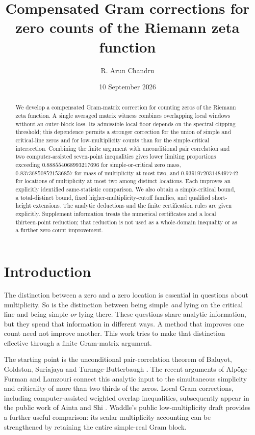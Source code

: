 \documentclass[11pt]{amsart}
\title[Compensated Gram corrections and zero counts]{Compensated Gram corrections for zero counts of the Riemann zeta function}
\author{R. Arun Chandru}
\date{10 September 2026}
\numberwithin{equation}{section}
\begin{document}
\begin{abstract}
We develop a compensated Gram-matrix correction for counting zeros of the
Riemann zeta function. A single averaged matrix witness combines overlapping
local windows without an outer-block loss. Its admissible local floor depends
on the spectral clipping threshold; this dependence permits a stronger
correction for the union of simple and critical-line zeros and for
low-multiplicity counts than for the simple-critical intersection.
Combining the finite argument with unconditional pair correlation and two
computer-assisted seven-point inequalities gives lower limiting proportions
exceeding $0.888554068993217696$ for simple-or-critical zero mass,
$0.837368508521536857$ for mass of multiplicity at most two, and
$0.939197203148497742$ for locations of multiplicity at most two among
distinct locations. Each improves an explicitly identified same-statistic
comparison. We also obtain a simple-critical bound, a total-distinct bound,
fixed higher-multiplicity-cutoff families, and qualified short-height
extensions. The analytic deductions and the finite certification rules are
given explicitly. Supplement information treats the numerical certificates
and a local thirteen-point reduction; that reduction is not used as a
whole-domain inequality or as a further zero-count improvement.
\end{abstract}
\maketitle
\tableofcontents

\section{Introduction}

The distinction between a zero and a zero location is essential in questions
about multiplicity. So is the distinction between being simple \emph{and}
lying on the critical line and being simple \emph{or} lying there. These
questions share analytic information, but they spend that information in
different ways. A method that improves one count need not improve another.
This work tries to make that distinction effective through a
finite Gram-matrix argument.

The starting point is the unconditional pair-correlation theorem of Baluyot,
Goldston, Suriajaya and Turnage-Butterbaugh \cite{BGST}. The recent arguments
of Alp\"oge--Furman and Lamzouri \cite{AF,Lamzouri} connect this analytic
input to the simultaneous simplicity and criticality of more than two thirds
of the zeros. Local Gram corrections, including computer-assisted weighted
overlap inequalities, subsequently appear in the public work of Ainta and
Shi \cite{Ainta,Shi}. Waddle's public low-multiplicity draft \cite{Waddle}
provides a further useful comparison: its scalar multiplicity accounting
can be strengthened by retaining the entire simple-real Gram block.
\end{document}
